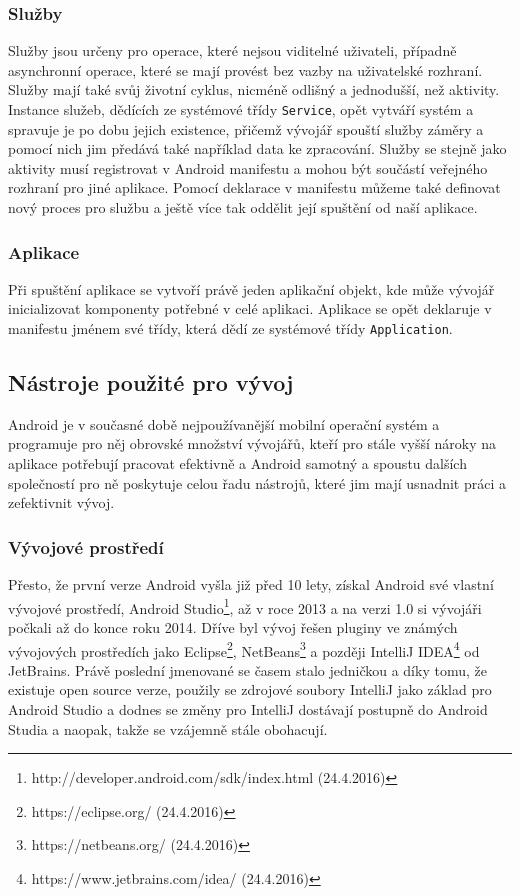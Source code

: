 \documentclass[czech,master,public,dept460,male,java,cpdeclaration]{diploma}
\begin{document}
\subsubsection{Služby}
Služby jsou určeny pro operace, které nejsou viditelné uživateli, případně asynchronní operace, které se mají
provést bez vazby na uživatelské rozhraní. Služby mají také svůj životní cyklus, nicméně odlišný a jednodušší,
než aktivity. Instance služeb, dědících ze systémové třídy \texttt{Service}, opět vytváří
systém a spravuje je po dobu jejich existence,
přičemž vývojář spouští služby záměry a pomocí nich jim předává také například data ke zpracování.
Služby se stejně jako aktivity musí registrovat v Android manifestu a mohou být součástí veřejného
rozhraní pro jiné aplikace. Pomocí deklarace v manifestu můžeme také definovat nový proces pro službu
a ještě více tak oddělit její spuštění od naší aplikace.

\subsubsection{Aplikace}
Při spuštění aplikace se vytvoří právě jeden aplikační objekt, kde může vývojář inicializovat
komponenty potřebné v celé aplikaci. Aplikace se opět deklaruje v manifestu jménem své třídy, která
dědí ze systémové třídy \texttt{Application}.

\subsection{Nástroje použité pro vývoj}
Android je v současné době nejpoužívanější mobilní operační systém a programuje pro něj obrovské
množství vývojářů, kteří pro stále vyšší nároky na aplikace potřebují pracovat efektivně a Android samotný
a spoustu dalších společností pro ně poskytuje celou řadu nástrojů, které jim mají usnadnit práci a zefektivnit vývoj.

\subsubsection{Vývojové prostředí}
Přesto, že první verze Android vyšla již před 10 lety, získal Android své vlastní vývojové prostředí,
Android Studio\footnote{http://developer.android.com/sdk/index.html (24.4.2016)},
až v roce 2013 a na verzi 1.0 si vývojáři počkali až do konce roku 2014. Dříve byl vývoj řešen pluginy ve známých
vývojových prostředích jako Eclipse\footnote{https://eclipse.org/ (24.4.2016)}, NetBeans\footnote{https://netbeans.org/ (24.4.2016)} a později
IntelliJ IDEA\footnote{https://www.jetbrains.com/idea/ (24.4.2016)}
od JetBrains. Právě poslední jmenované
se časem stalo jedničkou a díky tomu, že existuje open source verze, použily se zdrojové soubory IntelliJ jako základ pro Android Studio
a dodnes se změny pro IntelliJ dostávají postupně do Android Studia a naopak, takže se vzájemně stále obohacují.
\end{document}
